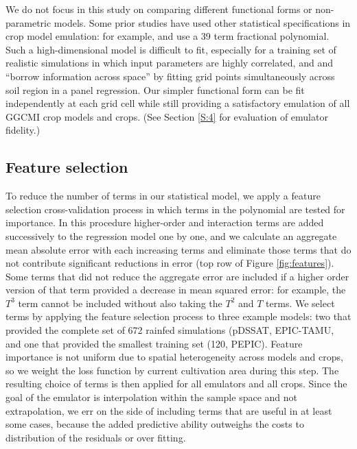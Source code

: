 \documentclass[gmd, manuscript]{copernicus} %
\begin{document}
We do not focus in this study on comparing different functional forms or non-parametric models.
Some prior studies have used other statistical specifications in crop model emulation: for example, \citet{BLANC2015} and \citet{BLANC2017} use a 39 term fractional polynomial. 
Such a high-dimensional model is difficult to fit, especially for a training set of realistic simulations in which input parameters are highly correlated, and  \citet{BLANC2015} and \citet{BLANC2017}  ``borrow information across space'' by fitting grid points simultaneously across soil region in a panel regression. 
Our simpler functional form can be fit independently at each grid cell while still providing a satisfactory emulation of all GGCMI crop models and crops. 
(See Section \ref{S:4} for evaluation of emulator fidelity.)

\subsection{Feature selection}
To reduce the number of terms in our statistical model, we apply a feature selection cross-validation process in which terms in the polynomial are tested for importance.
In this procedure higher-order and interaction terms are added successively to the regression model one by one, and 
we calculate an aggregate mean absolute error with each increasing terms and eliminate those terms that do not contribute significant reductions in error (top row of Figure \ref{fig:features}). 
Some terms that did not reduce the aggregate error are included if a higher order version of that term provided a decrease in mean squared error: for example, the $T^3$ term cannot be included without also taking the $T^2$ and $T$ terms. 
We select terms by applying the feature selection process to three example models: two that provided the complete set of 672 rainfed simulations (pDSSAT, EPIC-TAMU, and one that provided the smallest training set (120, PEPIC). 
Feature importance is not uniform due to spatial heterogeneity across models and crops, so we weight the loss function by current cultivation area \citep{Portmann2010} during this step. 
The resulting choice of terms is then applied for all emulators and all crops. 
Since the goal of the emulator is interpolation within the sample space and not extrapolation, we err on the side of including terms that are useful in at least some cases, because the added predictive ability outweighs the costs to distribution of the residuals or over fitting.  
\end{document}

